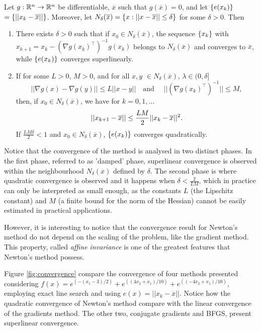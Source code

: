 \begin{theorem} \label{thm:newton_convergence}
Let $g: \mathbb{R}^n \rightarrow \mathbb{R}^n$ be differentiable, $\overline{x}$ such that $g(\overline{x}) = 0$, and let $\left\{ e(x_k) \right \} $ $= \left\{ ||x_k - \overline{x}|| \right \}$. Moreover, let $N_\delta(\overline{x}) = \left\{ x : ||x  - \overline{x}|| \leq \delta \right \}$ for some $\delta >0 $. Then
\begin{enumerate}
\item There exists $\delta > 0$ such that if $x_0 \in N_\delta(\overline{x})$, the sequence $\left\{ x_k \right \}$ with $x_{k+1} = x_k - (\nabla g(x_k)^\top)^{-1}g(x_k)$ belongs to $N_\delta(\overline{x})$ and converges to $\overline{x}$, while $\left\{ e(x_k) \right \}$ converges superlinearly.
\item If for some $L>0$, $M>0$, and for all $x,y$ $\in N_\delta(\overline{x})$, $\lambda \in (0,\delta]$
$$||\nabla g(x) - \nabla g(y)|| \leq L||x-y|| \quad\text{and }\quad ||(\nabla g(x_k)^\top)^{-1}|| \leq M,$$ 
then, if $x_0 \in N_\delta(\overline{x})$, we have for $k = 0,1,\dots$
\vspace{-6pt}
$$ ||x_{k+1} - \overline{x}|| \leq \frac{LM}{2}||x_k - \overline{x}||^2.
\vspace{-6pt}
$$
If $\frac{LM\delta}{2} < 1$ and $x_0 \in N_\delta(\overline{x})$, $\left\{ e(x_k) \right \}$ converges quadratically.
\end{enumerate}
\end{theorem}

Notice that the convergence of the method is analysed in two distinct phases. In the first phase, referred to as 'damped' phase, superlinear convergence is observed within the neighbourhood $N_\delta(\overline{x})$ defined by $\delta$. The second phase is where quadratic convergence is observed and it happens when $\delta < \frac{2}{LM}$, which in practice can only be interpreted as small enough, as the constants $L$ (the Lipschitz constant) and $M$ (a finite bound for the norm of the Hessian) cannot be easily estimated in practical applications. 

However, it is interesting to notice that the convergence result for Newton's method do not depend  on the scaling of the problem, like the gradient method. This property, called \emph{affine invariance} is one of the greatest features that Newton's method possess. 

Figure \ref{fig:convergence} compare the convergence of four methods presented considering $f(x)=e^{(-(x_1-3)/2)} + e^{((4x_2 + x_1)/10)} + e^{((-4x_2 + x_1)/10)}$, employing exact line search and using $e(x) = ||x_k - \overline{x}||$. Notice how the quadratic convergence of Newton's method compare with the linear convergence of the gradients method. The other two, conjugate gradients and BFGS, present superlinear convergence.

